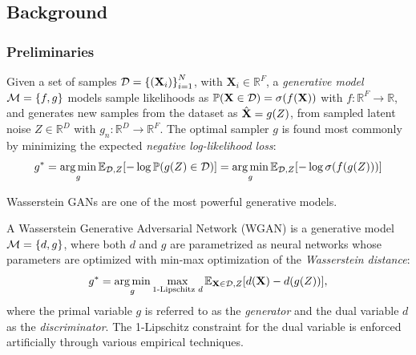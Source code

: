 \subsection{Background}
\label{sec:background_gggcrp}

\subsubsection{Preliminaries}

\begin{definition}
    Given a set of samples $\mathcal{D}=\mathopen{}\left\{\mathopen{}\left(\mathbf{X}_i\right)\right\}_{i=1}^{N}$, with $\mathbf{X}_i \in \mathbb{R}^F$, a \emph{generative model} $\mathcal{M}=\mathopen{}\left\{f,g\right\}$ models sample likelihoods as $\mathbb{P}\mathopen{}\left(\mathbf{X} \in \mathcal{D}\right)=\sigma\mathopen{}\left(f\mathopen{}\left(\mathbf{X}\right)\right)$ with $f: \mathbb{R}^F \to \mathbb{R}$, and generates new samples from the dataset as $\hat{\mathbf{X}}=g\mathopen{}\left(Z\right)$, from sampled latent noise $Z\in\mathbb{R}^D$ with $g_n:\mathbb{R}^D \to \mathbb{R}^F$. The optimal sampler $g$ is found most commonly by minimizing the expected \emph{negative log-likelihood loss}:
    \begin{equation}
        g^*=\operatorname*{arg\,min}_{g}{\mathbb{E}_{\mathcal{D},Z}\mathopen{}\left[-\log{\mathbb{P}\mathopen{}\left(g\mathopen{}\left(Z\right) \in \mathcal{D}\right)}\right]}=\operatorname*{arg\,min}_{g}{\mathbb{E}_{\mathcal{D},Z}\mathopen{}\left[-\log{\sigma\mathopen{}\left(f\mathopen{}\left(g\mathopen{}\left(Z\right)\right)\right)}\right]}
    \end{equation}
\end{definition}

Wasserstein GANs are one of the most powerful generative models.

\begin{definition}
   A Wasserstein Generative Adversarial Network (WGAN) \cite{arjovsky_wasserstein_2017} is a generative model $\mathcal{M}=\mathopen{}\left\{d,g\right\}$, where both $d$ and $g$ are parametrized as neural networks whose parameters are optimized with min-max optimization of the \emph{Wasserstein distance}:
   \begin{equation}
   g^*=\operatorname*{arg\,min}_{g}\max_{\text{1-Lipschitz } d}{\mathbb{E}_{\mathbf{X}\in\mathcal{D},Z}\mathopen{}\left[d\mathopen{}\left(\mathbf{X}\right)-d\mathopen{}\left(g\mathopen{}\left(Z\right)\right)\right]},
    \end{equation}
   where the primal variable $g$ is referred to as the \emph{generator} and the dual variable $d$ as the \emph{discriminator}. The 1-Lipschitz constraint for the dual variable is enforced artificially through various empirical techniques.
\end{definition}

